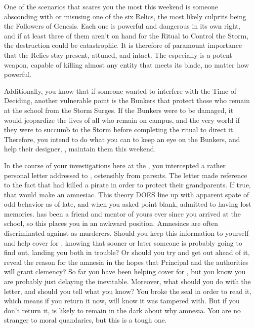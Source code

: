 \documentclass[char]{GL2020}
\begin{document}
One of the scenarios that scares you the most this weekend is someone absconding with or misusing one of the six Relics, the most likely culprits being the Followers of Genesis. Each one is powerful and dangerous in its own right, and if at least three of them aren't on hand for the Ritual to Control the Storm, the destruction could be catastrophic. It is therefore of paramount importance that the Relics stay present, attuned, and intact. The \iScythe{} especially is a potent weapon, capable of killing almost any entity that meets its blade, no matter how powerful. 

Additionally, you know that if someone wanted to interfere with the Time of Deciding, another vulnerable point is the Bunkers that protect those who remain at the school from the Storm Surges. If the Bunkers were to be damaged, it would jeopardize the lives of all who remain on campus, and the very world if they were to succumb to the Storm before completing the ritual to direct it. Therefore, you intend to do what you can to keep an eye on the Bunkers, and help their designer, \cBunker{\full}, maintain them this weekend.

In the course of your investigations here at the \pSc{}, you intercepted a rather personal letter addressed to \cLibrarian{\full}, ostensibly from \cLibrarian{\their} parents. The letter made reference to the fact that \cLibrarian{} had killed a pirate in order to protect their grandparents. If true, that would make \cLibrarian{} an amnesiac. This theory DOES line up with \cLibrarian{\their} apparent spate of odd behavior as of late, and when you asked \cLibrarian{\them} point blank, \cLibrarian{\they} admitted to having lost \cLibrarian{\their} memories. \cLibrarian{} has been a friend and mentor of yours ever since you arrived at the school, so this places you in an awkward position. Amnesiacs are often discriminated against as murderers. Should you keep this information to yourself and help cover for , knowing that sooner or later someone is probably going to find out, landing you both in trouble? Or should you try and get out ahead of it, reveal the reason for the amnesia in the hopes that Principal \cPrincipal{\full} and the authorities will grant clemency? So far you have been helping cover for \cLibrarian{\them}, but you know you are probably just delaying the inevitable. Moreover, what should you do with the letter, and should you tell \cLibrarian{} what you know? You broke the seal in order to read it, which means if you return it now, \cLibrarian{} will know it was tampered with. But if you don't return it, \cLibrarian{\they} is likely to remain in the dark about why \cLibrarian{\they} \cLibrarian{\have} amnesia. You are no stranger to moral quandaries, but this is a tough one.
\end{document}
